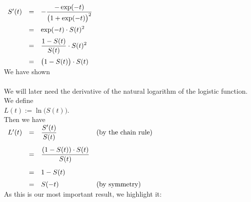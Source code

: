 \hspace*{1.3cm}
$
\begin{array}{lcl}
 S'(t) & = & \displaystyle -\frac{-\exp(-t)}{\bigr(1+\exp(-t)\bigr)^2}   \\[0.5cm]
       & = & \displaystyle \exp(-t) \cdot S(t)^2                       \\[0.2cm]
       & = & \displaystyle \frac{1-S(t)}{S(t)} \cdot S(t)^2            \\[0.4cm]
       & = & \displaystyle \bigl(1 - S(t)\bigr) \cdot S(t)            
\end{array}
$
\\[0.2cm]
We have shown
\\[0.2cm]
\hspace*{1.3cm}
\colorbox{red}{}
\\[0.2cm]
We will later need the derivative of the natural logarithm of the logistic function.  We define
\\[0.2cm]
\hspace*{1.3cm}
$L(t) := \ln\bigl(S(t)\bigr)$.
\\[0.2cm]
Then we have
\\[0.2cm]
\hspace*{1.3cm}
$
\begin{array}{lcll}
  L'(t) & = & \displaystyle \frac{S'(t)}{S(t)}                  & \mbox{(by the chain rule)} \\[0.5cm]
        & = & \displaystyle \frac{(1 - S(t)) \cdot S(t)}{S(t)}                               \\[0.5cm]
        & = & \displaystyle 1 - S(t)                                                         \\[0.2cm]
        & = & \displaystyle S(-t)                               & \mbox{(by symmetry)} 
\end{array}
$
\\[0.2cm]
As this is our most important result, we highlight it:
\\[0.2cm]
\hspace*{1.3cm}
\colorbox{red}{}



